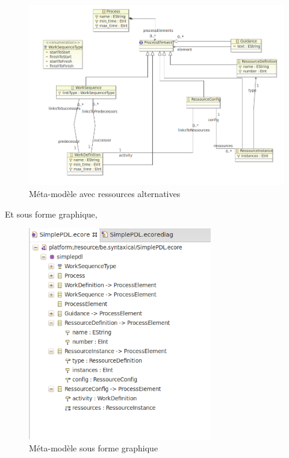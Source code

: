 \begin{figure}[!h] 
\begin{center}
\includegraphics[width=15cm]{Capture-13.png}
\caption{Méta-modèle avec ressources alternatives} 
\label{img1} 
\end{center}
\end{figure} 

Et sous forme graphique,\\

\newpage

\begin{figure}[!h] 
\begin{center}
\includegraphics[width=8cm]{Capture-14.png}
\caption{Méta-modèle sous forme graphique} 
\label{img1} 
\end{center}
\end{figure} 

